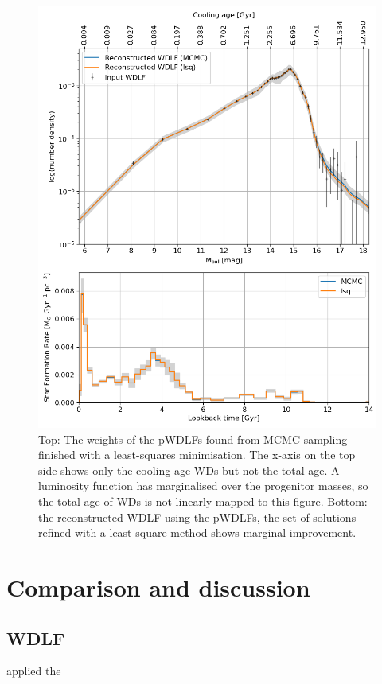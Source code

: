 \documentclass[fleqn,usenatbib]{mnras}
\begin{document}
\begin{figure}
    \includegraphics[width=\textwidth]{figures/fig_05_gcns_reconstructed_wdlf_optimal_resolution_bin_optimal.png}
    \caption{Top: The weights of the pWDLFs found from MCMC sampling finished
    with a least-squares minimisation. The x-axis on the top side shows only
    the cooling age WDs but not the total age. A luminosity function has
    marginalised over the progenitor masses, so the total age of WDs is not
    linearly mapped to this figure. Bottom: the reconstructed WDLF using the
    pWDLFs, the set of solutions refined with a least square method shows
    marginal improvement.}
    \label{fig:sfh_mag_bin_05}
\end{figure}


\section{Comparison and discussion}
\subsection{WDLF}
\citet{2013MNRAS.434.1549R} applied the 
\end{document}
